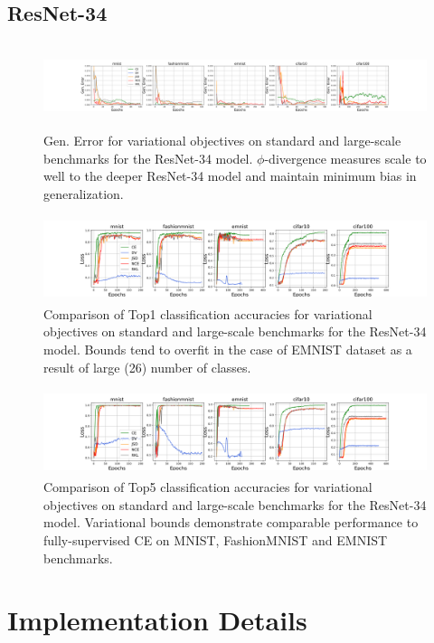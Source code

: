 \documentclass{article}
\begin{document}
\subsection{ResNet-34}
\begin{figure}[H]
  \centering
    \includegraphics[height=2.5cm,width=14cm]{34_gen_error.png}
    \caption{Gen. Error for variational objectives on standard and large-scale benchmarks for the ResNet-34 model. $\phi$-divergence measures scale to well to the deeper ResNet-34 model and maintain minimum bias in generalization.}
  \end{figure}
  \begin{figure}[H]
    \centering
      \includegraphics[height=2.5cm,width=14cm]{34_top1_acc.png}
      \caption{Comparison of Top1 classification accuracies for variational objectives on standard and large-scale benchmarks for the ResNet-34 model. Bounds tend to overfit in the case of EMNIST dataset as a result of large (26) number of classes.}
    \end{figure}
    \begin{figure}[H]
      \centering
        \includegraphics[height=2.5cm,width=14cm]{34_top5_acc.png}
        \caption{Comparison of Top5 classification accuracies for variational objectives on standard and large-scale benchmarks for the ResNet-34 model. Variational bounds demonstrate comparable performance to fully-supervised CE on MNIST, FashionMNIST and EMNIST benchmarks.}
      \end{figure}
      
\section{Implementation Details}
\end{document}
